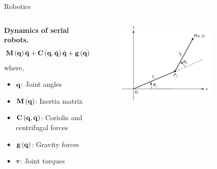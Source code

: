 \documentclass[aspectratio=169]{beamer}
\let\olditem\item
\renewcommand{\item}{\setlength{\itemsep}{\fill}\olditem}
\def\mf{\ensuremath\mathbf}
\def\lp{\ensuremath\left(}
\def\rp{\ensuremath\right)}
\newcommand{\ct}[1]{\lp #1\rp}
\begin{document}
\begin{frame}{Robotics}
  \begin{columns}
    \begin{column}{0.5\textwidth}
      \textbf{Dynamics of serial robots.}
      \[ 
        \mf{M}\ct{\mf{q}} \ddot{\mf{q}} + \mf{C}\ct{\mf{q}, \dot{\mf{q}}} \dot{\mf{q}} + \mf{g}\ct{\mf{q}} = \bm{\tau} + \mf{J}^\top \mf{f}
      \]
      where,
      \begin{itemize}
        \item $\mf{q}$: Joint angles
        \item $\mf{M}\ct{\mf{q}}$: Inertia matrix
        \item $\mf{C}\ct{\mf{q}, \dot{\mf{q}}}$: Coriolis and centrifugal forces
        \item $\mf{g}\ct{\mf{q}}$: Gravity forces
        \item $\bm{\tau}$: Joint torques
      \end{itemize}
      
    \end{column}
    \begin{column}{0.45\textwidth}
      \begin{figure}
        \centering
        \includegraphics[width=0.8\textwidth]{2links.png}
      \end{figure}
    \end{column}    
  \end{columns}
\end{frame}

  
\end{document}
